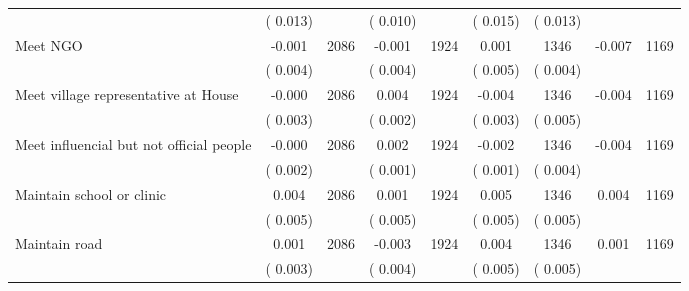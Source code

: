 \begin{tabular}{l*{8}{c}}
                       &       (       0.013)            &                               &       (       0.010)            &                               &       (       0.015)            &       (       0.013) &                  \\
Meet NGO        &             -0.001      &       2086       &             -0.001      &       1924       &              0.001      &       1346  &       -0.007 &       1169       \\
                       &       (       0.004)            &                               &       (       0.004)            &                               &       (       0.005)            &       (       0.004) &                  \\
Meet village representative at House        &             -0.000      &       2086       &              0.004      &       1924       &             -0.004      &       1346  &       -0.004 &       1169       \\
                       &       (       0.003)            &                               &       (       0.002)            &                               &       (       0.003)            &       (       0.005) &                  \\
Meet influencial but not official people        &             -0.000      &       2086       &              0.002      &       1924       &             -0.002      &       1346  &       -0.004 &       1169       \\
                       &       (       0.002)            &                               &       (       0.001)            &                               &       (       0.001)            &       (       0.004) &                  \\
Maintain school or clinic        &              0.004      &       2086       &              0.001      &       1924       &              0.005      &       1346  &        0.004 &       1169       \\
                       &       (       0.005)            &                               &       (       0.005)            &                               &       (       0.005)            &       (       0.005) &                  \\
Maintain road        &              0.001      &       2086       &             -0.003      &       1924       &              0.004      &       1346  &        0.001 &       1169       \\
                       &       (       0.003)            &                               &       (       0.004)            &                               &       (       0.005)            &       (       0.005) &                  \\

\end{tabular}
